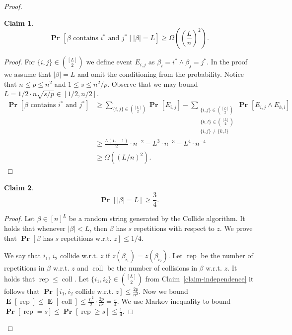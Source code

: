 \documentclass{article}
\newcommand{\probs}[2]{\operatorname{\mathbf{Pr}}_{{#1}}\left[{#2}\right]}
\newcommand{\prob}[1]{\probs{}{#1}}
\newcommand{\expects}[2]{\operatorname{\mathbf{E}}_{{#1}}\left[{#2}\right]}
\newcommand{\expect}[1]{\expects{}{#1}}
\newtheorem{claim}{Claim}
\begin{document}
\begin{proof}
\begin{claim}
\[ \prob{\beta\mbox{ contains }i^{*}\mbox{ and }j^{*} \mid |\beta| = L} \geq \Omega\left(\left(\frac{L}{n}\right)^2\right). \]
\end{claim}
\begin{proof}
For $\{i, j\} \in \binom{[L]}{2}$ we define event $E_{i, j}$ as $\beta_i = i^* \wedge \beta_j = j^*$.
In the proof we assume that $|\beta| = L$ and omit the conditioning from the probability.
Notice that $n \leq p \leq n^2$ and $1 \leq s \leq n^2/p$.
Observe that we may bound $L = 1/2 \cdot n\sqrt{s/p} \in [1/2, n/2]$.
\begin{align*}
    \prob{\beta\mbox{ contains }i^{*}\mbox{ and }j^{*}} 
        & \geq \sum_{\{i, j\} \in \binom{[L]}{2}} \prob{E_{i, j}} - \sum_{\substack{\{i, j\} \in \binom{[L]}{2} \\ \{k, l\} \in \binom{[L]}{2} \\ \{i, j\} \neq \{k, l\}}} \prob{E_{i, j} \wedge E_{k, l}} \\
        & \geq \frac{L(L-1)}{2} \cdot n^{-2} - L^3 \cdot n^{-3} - L^4 \cdot n^{-4} \\
        & \geq \Omega\left((L/n)^2\right).
\end{align*}
\end{proof}

\begin{claim}
\[ \prob{|\beta| = L} \geq \frac{3}{4}. \]
\end{claim}
\begin{proof}
Let $\beta \in [n]^L$ be a random string generated by the Collide algorithm.
It holds that whenever $|\beta| < L$, then $\beta$ has $s$ repetitions with respect to $z$.
We prove that $\prob{\beta\mbox{ has }s\mbox{ repetitions w.r.t. }z} \leq 1/4$.

We say that $i_1$, $i_2$ collide w.r.t. $z$ if $z(\beta_{i_1}) = z(\beta_{i_2})$.
Let $\operatorname{rep}$ be the number of repetitions in $\beta$ w.r.t. $z$ and $\operatorname{coll}$ be the number of collisions in $\beta$ w.r.t. $z$. 
It holds that $\operatorname{rep} \leq \operatorname{coll}$.
Let $\{i_1, i_2\} \in \binom{[L]}{2}$ from Claim~\ref{claim-independence} it follows that $\prob{i_1, i_2\mbox{ collide w.r.t. }z} \leq \frac{2p}{n^2}$.
Now we bound $\expect{\operatorname{rep}} \leq \expect{\operatorname{coll}} \leq \frac{L^2}{2} \cdot \frac{2p}{n^2} = \frac{s}{4}.$
We use Markov inequality to bound $\prob{\operatorname{rep} = s} \leq \prob{\operatorname{rep} \geq s} \leq \frac{1}{4}.$ 
\end{proof}

\end{proof}
\end{document}
